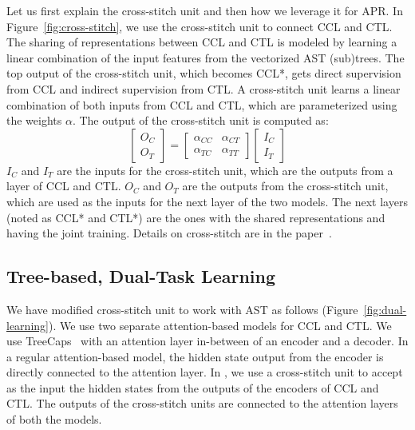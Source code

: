 Let us first explain the cross-stitch unit and then how we leverage it
for APR. In Figure~\ref{fig:cross-stitch},
we use the cross-stitch unit to connect CCL and CTL. The sharing of
representations between CCL and CTL is modeled by learning a linear
combination of the input features from the vectorized AST
(sub)trees. The top output of the cross-stitch unit, which becomes
CCL*, gets direct supervision from CCL and indirect supervision from
CTL.
A cross-stitch unit learns a linear combination of both inputs from
CCL and CTL, which are parameterized using the weights $\alpha$. The
output of the cross-stitch unit is computed as:
\begin{equation}\label{eq:cross-stitch}
	\begin{bmatrix}
		O_C\\
		O_T
	\end{bmatrix}
	=
	\begin{bmatrix}
		\alpha_{CC} &  \alpha_{CT} \\
		\alpha_{TC} &  \alpha_{TT}
	\end{bmatrix}
	\begin{bmatrix}
		I_C\\
		I_T
	\end{bmatrix}
\end{equation}
$I_C$ and $I_T$ are the inputs for the cross-stitch unit, which are
the outputs from a layer of CCL and CTL. $O_C$ and $O_T$ are the
outputs from the cross-stitch unit, which are used as the inputs
for the next layer of the two models.
The next layers (noted as CCL* and CTL*) are the ones with the shared
representations and having the joint training. Details on
cross-stitch are in the paper~\cite{misra2016cross}.

\subsection{Tree-based, Dual-Task Learning}



We have modified cross-stitch unit to work with AST as follows
(Figure~\ref{fig:dual-learning}). We use two separate attention-based
 models for CCL and CTL. We use
TreeCaps~\cite{bui2021treecaps} with an attention layer in-between of
an encoder and a decoder. In a regular attention-based 
model, the hidden state output from the encoder is directly connected
to the attention layer. In {\tool}, we use a cross-stitch unit to
accept as the input the hidden states from the outputs of the encoders
of CCL and CTL. The outputs of the cross-stitch units are connected to
the attention layers of both the models.

